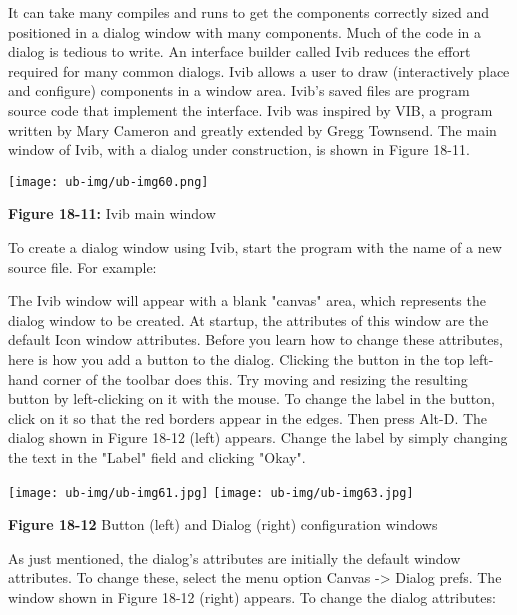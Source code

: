 It can
take many compiles and runs to get the components
correctly sized and positioned
in a dialog window with many components. Much of the code in a
dialog is tedious to write.
An
interface builder called Ivib
reduces the effort required for many common dialogs.
Ivib allows a user to draw (interactively place and configure)
components in a window area. Ivib's saved files are program source code
that implement the interface. Ivib was inspired by VIB, a program
written by Mary Cameron and greatly extended by
Gregg Townsend. The main window of Ivib, with a
dialog under construction, is shown in Figure 18-11.

\begin{center}
\texttt{[image: ub-img/ub-img60.png]}
\end{center}

{\sffamily\bfseries Figure 18-11:}
{\sffamily Ivib main window}

To create a dialog window using Ivib, start the program with the name of
a new source file. For example:


The Ivib window will appear with a blank
"canvas" area, which represents the dialog
window to be created. At startup, the attributes of this window are the
default Icon window attributes. Before you learn how to change these
attributes, here is how you add a button to the dialog. Clicking the
button in the top left-hand corner of the toolbar does this. Try moving
and resizing the resulting button by left-clicking on it with the
mouse. To change the label in the button, click on it so that the red
borders appear in the edges. Then press Alt-D. The dialog shown in
Figure 18-12 (left) appears.
Change the label by simply changing the text in the
"Label" field and clicking "Okay".

\bigskip

\noindent \texttt{[image: ub-img/ub-img61.jpg]}
\texttt{[image: ub-img/ub-img63.jpg]}

{\sffamily\bfseries Figure 18-12}
{\sffamily Button (left) and Dialog (right) configuration windows}

\bigskip

As just mentioned, the dialog's attributes are
initially the default window attributes. To change these, select the
menu option Canvas -{\textgreater} Dialog prefs. The window shown in
Figure 18-12 (right) appears. To change the dialog attributes:

